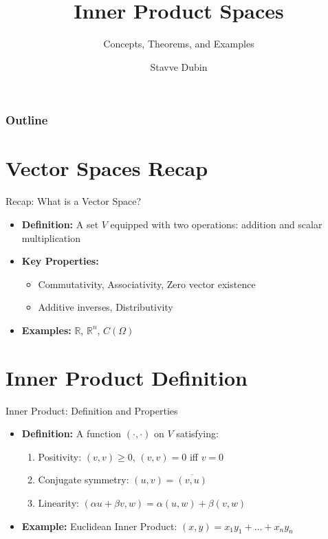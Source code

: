 \documentclass[
	aspectratio=169,    %
	onlytextwidth,        %
	t,                    %
]{beamer}
\title[Inner Product Spaces]{Inner Product Spaces}
\subtitle{Concepts, Theorems, and Examples}
\author[Roma Talekar]{Stavve Dubin}
\begin{document}
\begin{frame}[plain]
    \titlepage
\end{frame}

\begin{frame}[plain]
    \frametitle{Outline}
    \tableofcontents
\end{frame}

\section{Vector Spaces Recap}
\begin{frame}{Recap: What is a Vector Space?}
    \begin{itemize}
        \item \textbf{Definition:} A set $V$ equipped with two operations: addition and scalar multiplication
        \item \textbf{Key Properties:}
        \begin{itemize}
            \item Commutativity, Associativity, Zero vector existence
            \item Additive inverses, Distributivity
        \end{itemize}
        \item \textbf{Examples:} $\mathbb{R}$, $\mathbb{R}^n$, $C(\Omega)$
    \end{itemize}
\end{frame}

\section{Inner Product Definition}
\begin{frame}{Inner Product: Definition and Properties}
    \begin{itemize}
        \item \textbf{Definition:} A function $(\cdot,\cdot)$ on $V$ satisfying:
        \begin{enumerate}
            \item Positivity: $(v,v) \geq 0$, $(v,v) = 0$ iff $v = 0$
            \item Conjugate symmetry: $(u,v) = \overline{(v,u)}$
            \item Linearity: $(\alpha u + \beta v, w) = \alpha (u,w) + \beta (v,w)$
        \end{enumerate}
        \item \textbf{Example:} Euclidean Inner Product: $(x,y) = x_1y_1 + \dots + x_ny_n$
    \end{itemize}
\end{frame}
\end{document}
